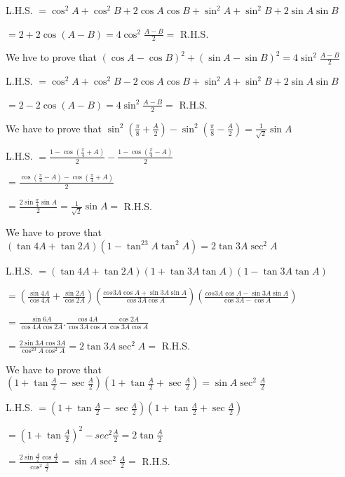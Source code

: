   L.H.S. $= \cos^2A + \cos^2B + 2\cos A\cos B + \sin^2A + \sin^2B + 2\sin A\sin B$

  $= 2 + 2\cos(A - B) = 4\cos^2\frac{A - B}{2} =$ R.H.S.

\item We hve to prove that $(\cos A - \cos B)^2 + (\sin A - \sin B)^2 = 4\sin^2 \frac{A - B}{2}$

  L.H.S. $= \cos^2A + \cos^2B - 2\cos A\cos B + \sin^2A + \sin^2B + 2\sin A\sin B$

  $= 2 - 2\cos(A - B) = 4\sin^2\frac{A - B}{2} =$ R.H.S.

\item We have to prove that $\sin^2\left(\frac{\pi}{8} + \frac{A}{2}\right) - \sin^2\left(\frac{\pi}{8} -\frac{A}{2}\right) =
  \frac{1}{\sqrt{2}}\sin A$

  L.H.S. $= \frac{1 - \cos\left(\frac{\pi}{4} + A\right)}{2} - \frac{1 - \cos\left(\frac{\pi}{4} - A\right)}{2}$

  $= \frac{\cos\left(\frac{\pi}{4} - A\right) - \cos\left(\frac{\pi}{4} + A\right)}{2}$

  $= \frac{2\sin\frac{\pi}{4}\sin A}{2} = \frac{1}{\sqrt{2}}\sin A =$ R.H.S.

\item We have to prove that $(\tan 4A + \tan 2A)(1 - \tan^23A\tan^2A) = 2\tan 3A\sec^2A$

  L.H.S. $= (\tan 4A + \tan 2A)(1 + \tan 3A\tan A)(1 - \tan 3A\tan A)$

  $= \left(\frac{\sin 4A}{\cos 4A} + \frac{\sin 2A}{\cos 2A}\right)\left(\frac{cos 3A\cos A + \sin 3A\sin A}{\cos 3A\cos
    A}\right)\left(\frac{cos 3A\cos A - \sin 3A\sin A}{\cos 3A - \cos A}\right)$

  $= \frac{\sin 6A}{\cos 4A\cos 2A}.\frac{\cos 4A}{\cos 3A\cos A}\frac{\cos 2A}{\cos 3A\cos A}$

  $= \frac{2\sin3A\cos3A}{\cos^23A\cos^2A} = 2\tan3A\sec^2A =$ R.H.S.

\item We have to prove that $\left(1 + \tan \frac{A}{2} - \sec\frac{A}{2}\right)\left(1 + \tan \frac{A}{2} +
  \sec\frac{A}{2}\right) = \sin A\sec^2\frac{A}{2}$

  L.H.S. $= \left(1 + \tan \frac{A}{2} - \sec\frac{A}{2}\right)\left(1 + \tan \frac{A}{2} +
  \sec\frac{A}{2}\right)$

  $= \left(1 + \tan\frac{A}{2}\right)^2 - sec^2\frac{A}{2} = 2\tan\frac{A}{2}$

  $= \frac{2\sin\frac{A}{2}\cos\frac{A}{2}}{\cos^2\frac{A}{2}} = \sin A\sec^2\frac{A}{2} =$ R.H.S.

